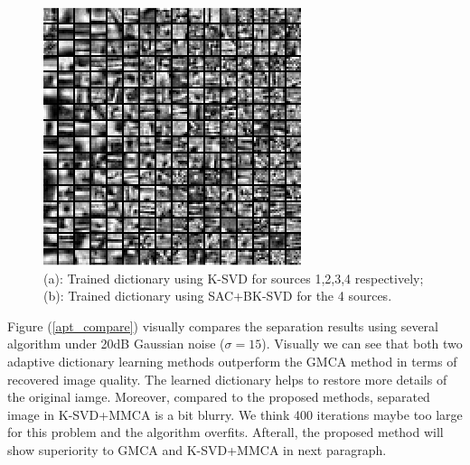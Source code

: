 \begin{figure}[!htbp]
{\begin{minipage}[b]{0.99\linewidth}
\includegraphics[width=0.15\linewidth]{images/blockdict4.png}
\end{minipage}}
\caption{(a): Trained dictionary using K-SVD for sources 1,2,3,4 respectively; (b): Trained dictionary using SAC+BK-SVD for the 4 sources.}
\label{dictionary_learned}
\end{figure}

Figure (\ref{apt_compare}) visually compares the separation results
using several algorithm under 20dB Gaussian noise ($\sigma = 15$). Visually we can see that both two adaptive dictionary learning methods outperform the GMCA method in terms of recovered image quality. The learned dictionary helps to restore more details of the original iamge. Moreover, compared to the proposed methods, separated image in K-SVD+MMCA is a bit blurry. We think 400 iterations maybe too large for this problem and the 
algorithm overfits. Afterall, the proposed method will show superiority to GMCA and K-SVD+MMCA in next paragraph.\\


